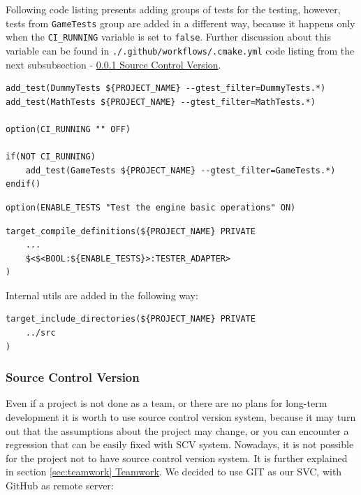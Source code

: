 Following code listing presents adding groups of tests for the testing, however, tests from \texttt{GameTests} group are added in a different way, because it happens only when the  \texttt{CI\_RUNNING} variable is set to \texttt{false}.
Further discussion about this variable can be found in \texttt{./.github/workflows/.cmake.yml} code listing from the next subsubsection - \hyperref[sec:scv]{\ref*{sec:scv} Source Control Version}.
\begin{lstlisting}[caption=Adding tests to CTest (./engine/CMakeLists.txt)]
add_test(DummyTests ${PROJECT_NAME} --gtest_filter=DummyTests.*)
add_test(MathTests ${PROJECT_NAME} --gtest_filter=MathTests.*)

option(CI_RUNNING "" OFF)

if(NOT CI_RUNNING)
    add_test(GameTests ${PROJECT_NAME} --gtest_filter=GameTests.*)
endif()
\end{lstlisting}

\begin{lstlisting}[caption=Enabling Tests(./CMakeLists.txt)]
option(ENABLE_TESTS "Test the engine basic operations" ON)
\end{lstlisting}

\begin{lstlisting}[caption=\texttt{TESTER\_ADAPTER} preprocessor declaration(./engine/CMakeLists.txt and ./engine/tests/CMakeLists.txt)]
target_compile_definitions(${PROJECT_NAME} PRIVATE
    ...
    $<$<BOOL:${ENABLE_TESTS}>:TESTER_ADAPTER>
)
\end{lstlisting}

Internal utils are added in the following way:
\begin{lstlisting}[caption=Including common internal utils (./engine/tests/CMakeLists.txt)]
target_include_directories(${PROJECT_NAME} PRIVATE
    ../src
)
\end{lstlisting}

\subsubsection{Source Control Version}
\label{sec:scv}
\hspace{\parindent}
Even if a project is not done as a team, or there are no plans for long-term development it is worth to use source control version system, because it may turn out that the assumptions about the project may change, or you can encounter a regression that can be easily fixed with SCV system.  Nowadays, it is not possible for the project not to have source control version system. It is further explained in section \hyperref[sec:teamwork]{\ref*{sec:teamwork} Teamwork}.
We decided to use GIT as our SVC, with GitHub as remote server:

